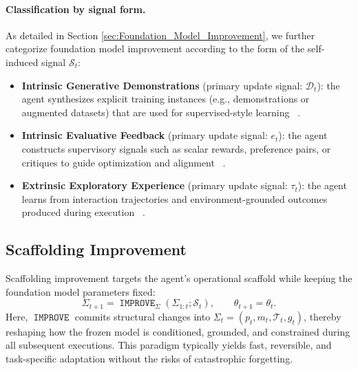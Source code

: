 \documentclass{article}
\newcommand{\IMPROVE}{\operatorname{\mathtt{IMPROVE}}}
\begin{document}
\paragraph{Classification by signal form.}
As detailed in Section \ref{sec:Foundation_Model_Improvement}, we further categorize foundation model improvement according to the form of the self-induced signal $\mathcal{S}_t$:
\begin{itemize}
    \item \textbf{Intrinsic Generative Demonstrations} (primary update signal: $\mathcal{D}_t$):
    the agent synthesizes explicit training instances (e.g., demonstrations or augmented datasets) that are used for supervised-style learning
    ~\citep{wang2022self, lu2023self, zhao2024selfguidebettertaskspecificinstruction, shi2025taskcraft}.

    \item \textbf{Intrinsic Evaluative Feedback} (primary update signal: $e_t$):
    the agent constructs supervisory signals such as scalar rewards, preference pairs, or critiques to guide optimization and alignment
    ~\citep{gong2025strive, huang2025beyond, bai2022constitutional, bensal2025reflect, zhang2025adaptive}.

    \item \textbf{Extrinsic Exploratory Experience} (primary update signal: $\tau_t$):
    the agent learns from interaction trajectories and environment-grounded outcomes produced during execution
    ~\citep{wei2025codearc, dong2025tool, da2025agent, sun2025seagentselfevolvingcomputeruse}.
\end{itemize}

\subsection{Scaffolding Improvement}
\label{subsec:Scaffolding_Improvement_(The_Non_Parametric_Fast_Loop)}

Scaffolding improvement targets the agent’s operational scaffold while keeping the foundation model parameters fixed:
\begin{equation}
    \Sigma_{t+1} = \IMPROVE_{\Sigma}(\Sigma_{1:t}; \mathcal{S}_{t}),
    \qquad
    \theta_{t+1} = \theta_{t}.
\end{equation}
Here, $\IMPROVE$ commits structural changes into $\Sigma_t=(p_t,m_t,\mathcal{T}_t,g_t)$,
thereby reshaping how the frozen model is conditioned, grounded, and constrained during all subsequent executions. This paradigm typically yields fast, reversible, and task-specific adaptation without the risks of catastrophic forgetting.
\end{document}
